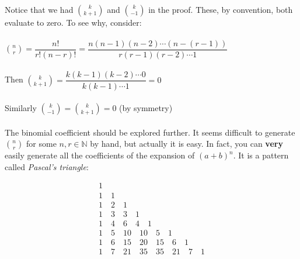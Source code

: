 \documentclass[12pt, a4paper, titlepage, twoside]{article}
\newcommand*{\N}{\mathbb{N}}
\begin{document}
	\paragraph{}
	Notice that we had $\displaystyle {k \choose {k+1}}$ and $\displaystyle {k \choose {-1}}$ in the proof.
	These, by convention, both evaluate to zero. To see why, consider:
	
	\paragraph{}
	$\displaystyle {n \choose r} = \dfrac{n!}{r!(n-r)!} = \dfrac{n(n-1)(n-2) \cdots (n - (r-1))}{r(r-1)(r-2) \cdots 1}$
	
	\paragraph{}
	Then $\displaystyle {k \choose {k+1}} = \dfrac{k(k-1)(k-2) \cdots 0}{k(k-1) \cdots 1} = 0$
	
	\paragraph{}
	Similarly $\displaystyle {k \choose {-1}} = {k \choose {k+1}} = 0$ (by symmetry)
	
	\paragraph{}
	The binomial coefficient should be explored further. It seems difficult to generate ${n \choose r}$ for some $n,r \in \N$ by hand, but
	actually it is easy. In fact, you can \textbf{very} easily generate all the coefficients of the expansion of $(a+b)^n$. It is a pattern
	called \textit{Pascal's triangle}:
	
	$$\begin{array}{c}1\\1\quad 1\\1\quad 2\quad 1\\1\quad 3\quad 3\quad 1\\1\quad 4\quad 6\quad 4\quad 1\\1\quad 5\quad 
	10\quad 10\quad 5\quad 1\\1\quad 6\quad 15\quad 20\quad 15\quad 6\quad 1\\1\quad 7\quad 21\quad 35\quad 35\quad 21\quad 
	7\quad 1\\\end{array}$$
	
	\hfill
	
\end{document}
